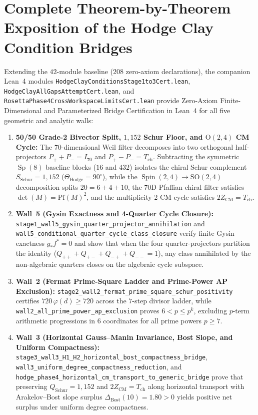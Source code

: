 \documentclass[11pt,a4paper]{article}
\begin{document}
\section{Complete Theorem-by-Theorem Exposition of the Hodge Clay Condition Bridges}

Extending the $42$-module baseline ($208$ zero-axiom declarations), the companion Lean~4 modules \texttt{HodgeClayConditionsStage1to3Cert.lean}, \texttt{HodgeClayAllGapsAttemptCert.lean}, and \texttt{RosettaPhase4CrossWorkspaceLimitsCert.lean} provide Zero-Axiom Finite-Dimensional and Parameterized Bridge Certification in Lean~4 for all five geometric and analytic walls:

\begin{enumerate}
\item \textbf{50/50 Grade-2 Bivector Split, $1{,}152$ Schur Floor, and $\mathrm{O}(2,4)$ CM Cycle:} The $70$-dimensional Weil filter decomposes into two orthogonal half-projectors $P_+ + P_- = I_{70}$ and $P_+ - P_- = T_{\mathrm{ch}}$. Subtracting the symmetric $\operatorname{Sp}(8)$ baseline blocks ($16$ and $432$) isolates the chiral Schur complement $S_{\mathrm{Schur}} = 1{,}152$ ($\Theta_{\mathrm{Hodge}} = 90^\circ$), while the $\operatorname{Spin}(2,4) \to \mathrm{SO}(2,4)$ decomposition splits $20 = 6 + 4 + 10$, the $70\mathrm{D}$ Pfaffian chiral filter satisfies $\det(M) = \mathrm{Pf}(M)^2$, and the multiplicity-2 CM cycle satisfies $2 Z_{\mathrm{CM}} = T_{\mathrm{ch}}$.
\item \textbf{Wall~5 (Gysin Exactness and 4-Quarter Cycle Closure):} \texttt{stage1\_wall5\_gysin\_quarter\_projector\_annihilation} and \texttt{wall5\_conditional\_quarter\_cycle\_class\_closure} verify finite Gysin exactness $g_* f^* = 0$ and show that when the four quarter-projectors partition the identity ($Q_{++} + Q_{+-} + Q_{-+} + Q_{--} = 1$), any class annihilated by the non-algebraic quarters closes on the algebraic cycle subspace.
\item \textbf{Wall~2 (Fermat Prime-Square Ladder and Prime-Power AP Exclusion):} \texttt{stage2\_wall2\_fermat\_prime\_square\_schur\_positivity} certifies $720\,\varphi(d) \ge 720$ across the $7$-step divisor ladder, while \texttt{wall2\_all\_prime\_power\_ap\_exclusion} proves $6 < p \le p^k$, excluding $p$-term arithmetic progressions in $6$ coordinates for all prime powers $p \ge 7$.
\item \textbf{Wall~3 (Horizontal Gauss--Manin Invariance, Bost Slope, and Uniform Compactness):} \texttt{stage3\_wall3\_H1\_H2\_horizontal\_bost\_compactness\_bridge}, \texttt{wall3\_uniform\_degree\_compactness\_reduction}, and \texttt{hodge\_phase4\_horizontal\_cm\_transport\_to\_generic\_bridge} prove that preserving $Q_{\mathrm{Schur}} = 1{,}152$ and $2 Z_{\mathrm{CM}} = T_{\mathrm{ch}}$ along horizontal transport with Arakelov--Bost slope surplus $\Delta_{\mathrm{Bost}}(10) = 1.80 > 0$ yields positive net surplus under uniform degree compactness.

\end{enumerate}
\end{document}
